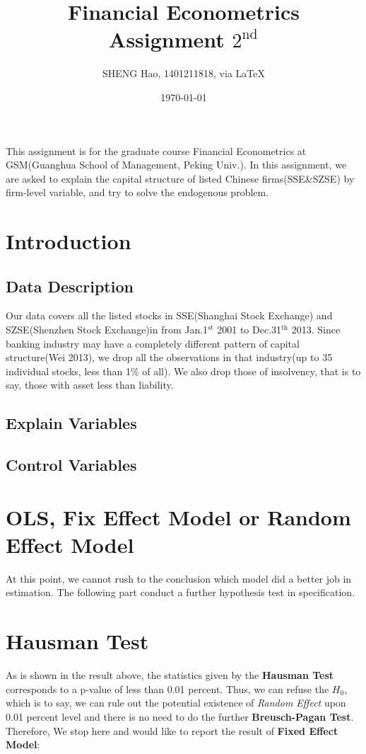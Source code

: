 \documentclass{article}
\begin{document}
\title{Financial Econometrics\\Assignment $2^{\text{nd}}$}
\author{{\normalsize SHENG Hao, 1401211818, via \LaTeX}}
\date{\today}

\maketitle

\def \Pr{{\rm Pr}}
\baselineskip 0.6cm

This assignment is for the graduate course Financial Econometrics at GSM(Guanghua School of Management, Peking Univ.). In this assignment, we are asked to explain the capital structure of listed Chinese firms(SSE\&SZSE) by firm-level variable, and try to solve the endogenous problem. 
\section{Introduction}
\subsection{Data Description}
Our data covers all the listed stocks in SSE(Shanghai Stock Exchange) and SZSE(Shenzhen Stock Exchange)in from Jan.1$^{\text{st}}$ 2001 to Dec.31$^{\text{th}}$ 2013. Since banking industry may have a completely different pattern of capital structure(Wei 2013), we drop all the observations in that industry(up to 35 individual stocks, less than 1\% of all). We also drop those of insolvency, that is to say, those with asset less than liability. 
\subsection{Explain Variables}
\subsection{Control Variables}
\newpage
\section{OLS, Fix Effect Model or Random Effect Model}

At this point, we cannot rush to the conclusion which model did a better job in estimation. The following part conduct a further hypothesis test in specification.

\newpage
\section{Hausman Test}
\begin{center}
	\begin{stlog}
	\nullskip
	\end{stlog}
\end{center}
As is shown in the result above, the statistics given by the {\bf Hausman Test} corresponds to a p-value of less than 0.01 percent. Thus, we can refuse the $H_0$, which is to say, we can rule out the potential existence of {\it Random Effect} upon 0.01 percent level and there is no need to do the further {\bf Breusch-Pagan Test}. 
Therefore, We stop here and would like to report the result of {\bf Fixed Effect Model}:

\end{document}
